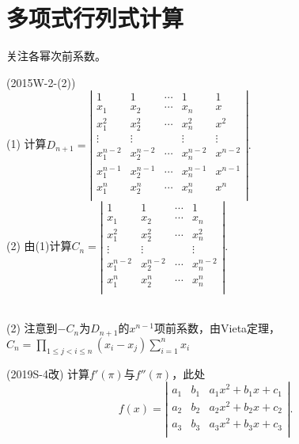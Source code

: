 \documentclass[lang=cn,newtx,10pt,scheme=chinese]{elegantbook}
\begin{document}
\section{多项式行列式计算}
关注各幂次前系数。

\begin{example}
    (2015W-2-(2)) \\
    (1) 计算$D_{n+1} = 
    \left|
    \begin{array}{ccccc}
        1         & 1         & \cdots & 1          & 1       \\
        x_1       & x_2       & \cdots & x_n        & x       \\
        x_1^2     & x_2^2     & \cdots & x_n^2      & x^2     \\
        \vdots    & \vdots    &        & \vdots     & \vdots  \\
        x_1^{n-2} & x_2^{n-2} & \cdots & x_n^{n-2}  & x^{n-2} \\
        x_1^{n-1} & x_2^{n-1} & \cdots & x_n^{n-1}  & x^{n-1} \\
        x_1^n     & x_2^n     & \cdots & x_n^n      & x^n     \\
    \end{array}
    \right|
	.
    $
    \\
    (2) 由(1)计算$C_n = 
    \left|
    \begin{array}{cccc}
        1         & 1         & \cdots & 1          \\
        x_1       & x_2       & \cdots & x_n        \\
        x_1^2     & x_2^2     & \cdots & x_n^2      \\
        \vdots    & \vdots    &        & \vdots     \\
        x_1^{n-2} & x_2^{n-2} & \cdots & x_n^{n-2}  \\
        x_1^n     & x_2^n     & \cdots & x_n^n      \\
    \end{array}
    \right|
	.
    $
\end{example}

\begin{solution}
    \ \\
    (2) 注意到$-C_n$为$D_{n+1}$的$x^{n-1}$项前系数，由Vieta定理，$C_n = \prod_{1 \le j < i \le n}(x_i - x_j) \sum_{i=1}^n x_i$
\end{solution}

\begin{exercise}
    (2019S-4改) 计算$f'(\pi)$与$f''(\pi)$，此处
    $$
    f(x) =
    \left|
    \begin{array}{ccc}
        a_1 & b_1 & a_1 x^2 + b_1 x + c_1 \\
        a_2 & b_2 & a_2 x^2 + b_2 x + c_2 \\
        a_3 & b_3 & a_3 x^2 + b_3 x + c_3 \\
    \end{array}
    \right|
	.
    $$
\end{exercise}
\end{document}
